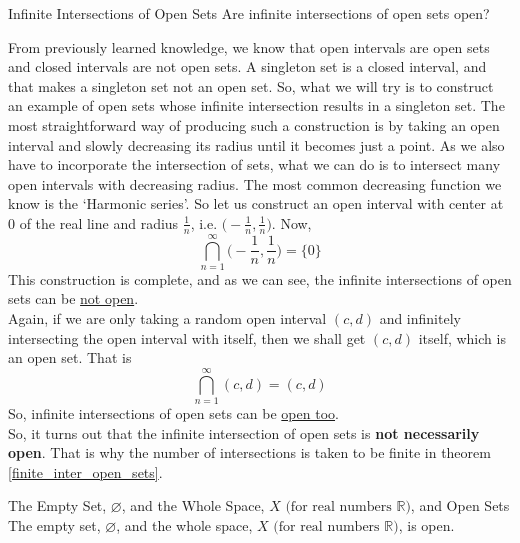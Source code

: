 \begin{Query}{Infinite Intersections of Open Sets}
    Are infinite intersections of open sets open?
\end{Query}
\begin{Investigation}
    From previously learned knowledge, we know that open intervals are open sets and closed intervals are not open sets. A singleton set is a closed interval, and that makes a singleton set not an open set. So, what we will try is to construct an example of open sets whose infinite intersection results in a singleton set. The most straightforward way of producing such a construction is by taking an open interval and slowly decreasing its radius until it becomes just a point. As we also have to incorporate the intersection of sets, what we can do is to intersect many open intervals with decreasing radius. The most common decreasing function we know is the `Harmonic series'. So let us construct an open interval with center at $0$ of the real line and radius $\frac{1}{n}$, i.e. $\big(-\frac{1}{n},\frac{1}{n}\big)$. Now,
    $$\bigcap_{n=1}^{\infty}\big(-\frac{1}{n},\frac{1}{n}\big)=\{0\}$$
    This construction is complete, and as we can see, the infinite intersections of open sets can be \underline{not open}.\\
    Again, if we are only taking a random open interval $(c,d)$ and infinitely intersecting the open interval with itself, then we shall get $(c,d)$ itself, which is an open set. That is
    $$\bigcap_{n=1}^{\infty}(c,d)=(c,d)$$
    So, infinite intersections of open sets can be \underline{open too}.\\
    So, it turns out that the infinite intersection of open sets is \textbf{not necessarily open}. That is why the number of intersections is taken to be finite in theorem \eqref{finite_inter_open_sets}.
\end{Investigation}
\begin{Theorem}{The Empty Set, $\varnothing$, and the Whole Space, $X\text{ (for real numbers }\mathbb{R})$, and Open Sets}\label{Empty_whole_space_open}
    The empty set, $\varnothing$, and the whole space, $X\text{ (for real numbers }\mathbb{R})$, is open.
\end{Theorem}
